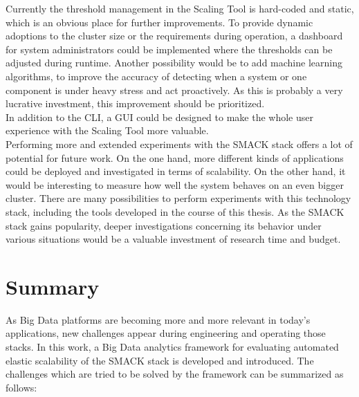 Currently the threshold management in the Scaling Tool is hard-coded and static, which is an obvious place for further improvements.
To provide dynamic adoptions to the cluster size or the requirements during operation, a dashboard for system administrators could be implemented where the thresholds can be adjusted during runtime.
Another possibility would be to add machine learning algorithms, to improve the accuracy of detecting when a system or one component is under heavy stress and act proactively.
As this is probably a very lucrative investment, this improvement should be prioritized.\\
In addition to the CLI, a GUI could be designed to make the whole user experience with the Scaling Tool more valuable.\\

Performing more and extended experiments with the SMACK stack offers a lot of potential for future work.
On the one hand, more different kinds of applications could be deployed and investigated in terms of scalability.
On the other hand, it would be interesting to measure how well the system behaves on an even bigger cluster.
There are many possibilities to perform experiments with this technology stack, including the tools developed in the course of this thesis.
As the SMACK stack gains popularity, deeper investigations concerning its behavior under various situations would be a valuable investment of research time and budget.

\section{Summary}
As Big Data platforms are becoming more and more relevant in today's applications, new challenges appear during engineering and operating those stacks.
In this work, a Big Data analytics framework for evaluating automated elastic scalability of the SMACK stack is developed and introduced.
The challenges which are tried to be solved by the framework can be summarized as follows:

